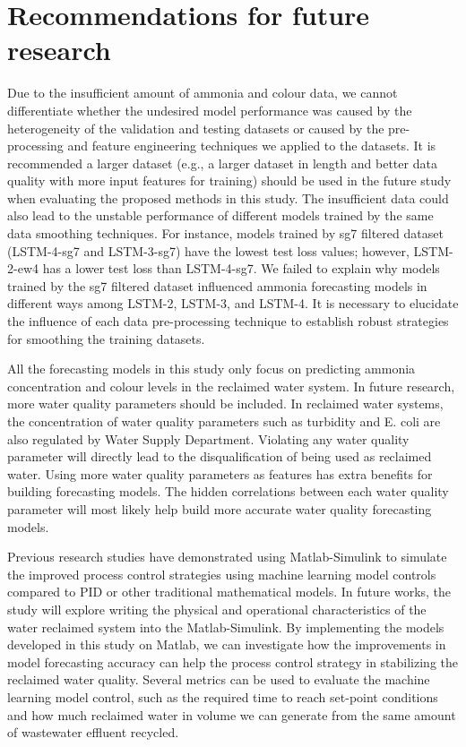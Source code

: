 \section{Recommendations for future research}
Due to the insufficient amount of ammonia and colour data, we cannot differentiate whether the undesired model performance was caused by the heterogeneity of the validation and testing datasets or caused by the pre-processing and feature engineering techniques we applied to the datasets. It is recommended a larger dataset (e.g., a larger dataset in length and better data quality with more input features for training) should be used in the future study when evaluating the proposed methods in this study. The insufficient data could also lead to the unstable performance of different models trained by the same data smoothing techniques. For instance, models trained by sg7 filtered dataset (LSTM-4-sg7 and LSTM-3-sg7) have the lowest test loss values; however, LSTM-2-ew4 has a lower test loss than LSTM-4-sg7. We failed to explain why models trained by the sg7 filtered dataset influenced ammonia forecasting models in different ways among LSTM-2, LSTM-3, and LSTM-4. It is necessary to elucidate the influence of each data pre-processing technique to establish robust strategies for smoothing the training datasets.

All the forecasting models in this study only focus on predicting ammonia concentration and colour levels in the reclaimed water system. In future research, more water quality parameters should be included. In reclaimed water systems, the concentration of water quality parameters such as turbidity and E. coli are also regulated by Water Supply Department. Violating any water quality parameter will directly lead to the disqualification of being used as reclaimed water. Using more water quality parameters as features has extra benefits for building forecasting models. The hidden correlations between each water quality parameter will most likely help build more accurate water quality forecasting models.

Previous research studies have demonstrated using Matlab-Simulink to simulate the improved process control strategies using machine learning model controls compared to PID or other traditional mathematical models. In future works, the study will explore writing the physical and operational characteristics of the water reclaimed system into the Matlab-Simulink. By implementing the models developed in this study on Matlab, we can investigate how the improvements in model forecasting accuracy can help the process control strategy in stabilizing the reclaimed water quality. Several metrics can be used to evaluate the machine learning model control, such as the required time to reach set-point conditions and how much reclaimed water in volume we can generate from the same amount of wastewater effluent recycled.